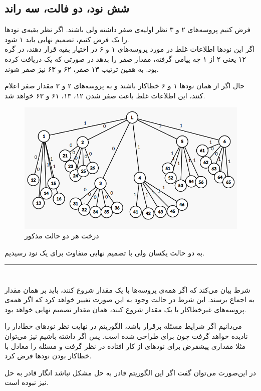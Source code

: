 \documentclass{article}
\begin{document}
\begin{multicols}{2}
\subsection{شش نود، دو فالت، سه راند}
فرض کنیم پروسه‌های ۲ و ۳ نظر اولیه‌ی صفر داشته ولی
باشند. اگر نظر بقیه‌ی نودها را یک فرض کنیم، تصمیم نهایی باید ۱ شود.\\
اگر این نودها اطلاعات غلط در مورد پروسه‌های ۱ و ۶ در اختیار بقیه قرار دهند، در گره ۱۲ یعنی ۲ از ۱ چه پیامی گرفته، مقدار صفر را بدهد در صورتی که یک دریافت کرده بود. به همین ترتیب ۱۳ صفر، ۶۲ و ۶۳ نیز صفر شوند.

حال اگر از همان نودها ۱ و ۶ خطاکار باشند و به پروسه‌های ۲ و ۳ مقدار صفر اعلام کنند، این اطلاعات غلط باعث صفر شدن ۱۲، ۱۳، ۶۱ و ۶۳ خواهد شد.
\begin{figure}[H]
    \centering
    \includegraphics[width=0.99\linewidth]{Photos/HW5/same.png}
    \caption{
    درخت هر دو حالت مذکور
    }
    \label{fig:my_label}
\end{figure}
به دو حالت یکسان ولی با تصمیم نهایی متفاوت برای یک نود رسیدیم.\\
\rule{\linewidth}{1pt}
\section{}
شرط
بیان می‌کند که اگر همه‌ی پروسه‌ها با یک مقدار شروع کنند، باید بر همان مقدار به اجماع برسند. این شرط در حالت وجود
به این صورت تغییر خواهد کرد که اگر همه‌ی پروسه‌های غیرخطاکار با یک مقدار شروع کنند، همان مقدار تصمیم نهایی خواهد بود.

می‌دانیم اگر شرایط مسئله برقرار باشد، الگوریتم
در نهایت نظر نودهای خطادار را نادیده خواهد گرفت چون برای
طراحی شده است. پس اگر
داشته باشیم نیز می‌توان مثلا مقداری پیشفرض برای نودهای از کار افتاده در نظر گرفت و مسئله را معادل با خطاکار بودن نودها فرض کرد.

در این‌صورت می‌توان گفت اگر این الگوریتم قادر به حل مشکل
نباشد انگار قادر به حل
نیز نبوده است.
\end{multicols}
\end{document}
